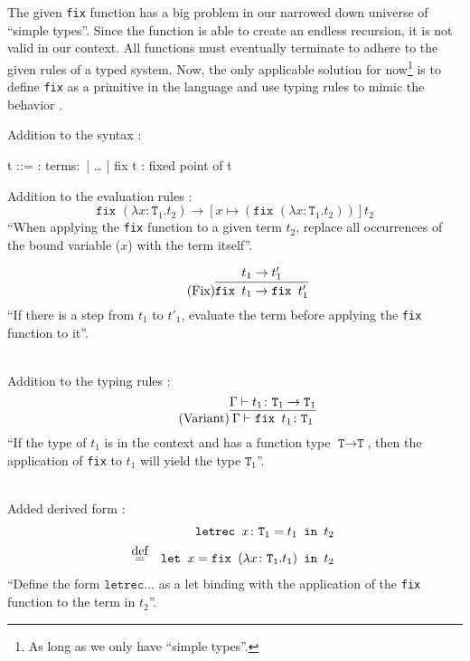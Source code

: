 The given \texttt{fix} function has a big problem in our narrowed down universe
of ``simple types''. Since the function is able to create an endless recursion,
it is not valid in our context. All functions must eventually terminate to adhere
to the given rules of a typed system. Now, the only applicable solution for
now\footnote{As long as we only have ``simple types''.} is to define \texttt{fix}
as a primitive in the language and use typing rules to mimic the behavior
\cite{pierce2002ProgLang}.

Addition to the syntax \cite{pierce2002ProgLang}:
\begin{bnfgrammar}
    t ::= : terms$\colon$
    | \dots
    | fix t : fixed point of t
\end{bnfgrammar}\leavevmode\newline

Addition to the evaluation rules \cite{pierce2002ProgLang}:
\begin{equation*}
    \tag{Fix Beta Reduction}
    \texttt{fix } (\lambda x \colon \texttt{T}_1 . t_2)
    \rightarrow
    [x \mapsto (\texttt{fix } (\lambda x \colon \texttt{T}_1 . t_2 ))]t_2
\end{equation*}
``When applying the \texttt{fix} function to a given term $t_2$,
replace all occurrences of the bound variable ($x$) with the
term itself''.

\begin{equation*}
    \tag{Fix}
    \infer{
        \texttt{fix } t_1 \rightarrow \texttt{fix } t'_1
    }{
        t_1 \rightarrow t'_1
    }
\end{equation*}
``If there is a step from $t_1$ to $t'_1$, evaluate the term
before applying the \texttt{fix} function to it''.

~\\
Addition to the typing rules \cite{pierce2002ProgLang}:
\begin{equation*}
    \tag{Variant}
    \infer{
        \Gamma \vdash \texttt{fix } t_1 \colon \texttt{T}_1
    }{
        \Gamma \vdash t_1 \colon \texttt{T}_1 \rightarrow \texttt{T}_1
    }
\end{equation*}
``If the type of $t_1$ is in the context and has a function type
$\texttt{T} \rightarrow \texttt{T}$, then the application of
\texttt{fix} to $t_1$ will yield the type $\texttt{T}_1$''.

~\\
Added derived form \cite{pierce2002ProgLang}:
\begin{equation*}
    \begin{split}
        \texttt{letrec } x \colon \texttt{T}_1 = t_1 \texttt{ in } t_2 \\
        \defeq \quad \texttt{let } x = \texttt{fix } (\lambda x \colon \texttt{T}_1 . t_1) \texttt{ in } t_2
    \end{split}
\end{equation*}
``Define the form $\texttt{letrec} \dots$ as a let binding with the application of
the \texttt{fix} function to the term in $t_2$''.
